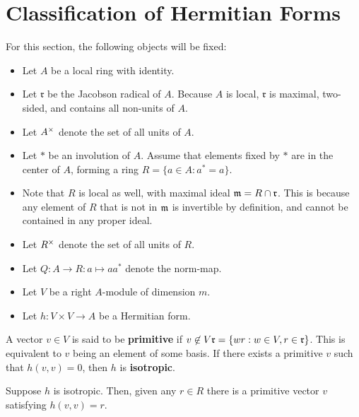 \documentclass[11pt]{article}
\begin{document}
\section*{Classification of Hermitian Forms}
\begin{definition*}
For this section, the following objects will be fixed:
\begin{itemize}
\item Let $A$ be a local ring with identity.

\item Let $\mathfrak{r}$ be the Jacobson radical of $A$. Because $A$ is local, $\mathfrak{r}$ is maximal, two-sided, and contains all non-units of $A$.

\item Let $A^\times$ denote the set of all units of $A$.

\item Let $*$ be an involution of $A$. Assume that elements fixed by $*$ are in the center of $A$, forming a ring $R = \{a \in A: a^* = a\}$. 

\item Note that $R$ is local as well, with maximal ideal $\mathfrak{m} = R \cap \mathfrak{r}$. 
This is because any element of $R$ that is not in $\mathfrak{m}$ is invertible by definition, and cannot be contained in any proper ideal.

\item Let $R^\times$ denote the set of all units of $R$.

\item Let $Q: A \to R: a \mapsto aa^*$ denote the norm-map.

\item Let $V$ be a right $A$-module of dimension $m$.

\item Let $h: V \times V \to A$ be a Hermitian form.
\end{itemize}

A vector $v \in V$ is said to be \textbf{primitive} if $v \not\in V \mathfrak{r} = \{wr : w \in V, r \in \mathfrak{r} \}$.
This is equivalent to $v$ being an element of some basis.
If there exists a primitive $v$ such that $h(v,v) = 0$, then $h$ is \textbf{isotropic}.
\end{definition*}

\begin{lemma*}
Suppose $h$ is isotropic. Then, given any $r \in R$ there is a primitive vector $v$ satisfying $h(v,v) = r$.
\end{lemma*}
\end{document}
